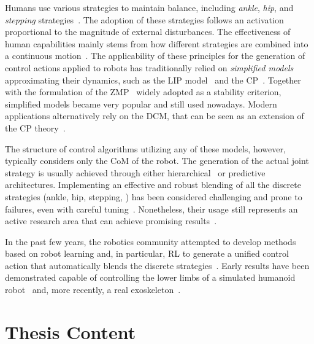 Humans use various strategies to maintain balance, including \emph{ankle}, \emph{hip}, and \emph{stepping} strategies~\parencite{nashner_organization_1985, maki_role_1997, stephens_humanoid_2007}.
The adoption of these strategies follows an activation proportional to the magnitude of external disturbances.
The effectiveness of human capabilities mainly stems from how different strategies are combined into a continuous motion~\parencite{mcgreavy_unified_2020}.
The applicability of these principles for the generation of control actions applied to robots has traditionally relied on \emph{simplified models} approximating their dynamics, such as the \ac{LIP} model~\parencite{kajita_3d_2001} and the \ac{CP}~\parencite{pratt_capture_2006}.
Together with the formulation of the \ac{ZMP}~\parencite{vukobratovic_contribution_1969, vukobratovic_zero-moment_2004} widely adopted as a stability criterion, simplified models became very popular and still used nowadays.
Modern applications alternatively rely on the \ac{DCM}, that can be seen as an extension of the \ac{CP} theory~\parencite{shafiee_online_2019}.

The structure of control algorithms utilizing any of these models, however, typically considers only the \ac{CoM} of the robot.
The generation of the actual joint strategy is usually achieved through either hierarchical~\parencite{feng_optimization_2014} or predictive~\parencite{wieber_trajectory_2006, aftab_ankle_2012} architectures.
Implementing an effective and robust blending of all the discrete strategies (ankle, hip, stepping, \etc) has been considered challenging and prone to failures, even with careful tuning~\parencite{mcgreavy_unified_2020}.
Nonetheless, their usage still represents an active research area that can achieve promising results~\parencite{jeong_robust_2019}.

In the past few years, the robotics community attempted to develop methods based on robot learning and, in particular, \ac{RL} to generate a unified control action that automatically blends the discrete strategies~\parencite{yang_learning_2018}.
Early results have been demonstrated capable of controlling the lower limbs of a simulated humanoid robot~\parencite{kim_push_2019} and, more recently, a real exoskeleton~\parencite{duburcq_reactive_2022}.

\section{Thesis Content}
\label{sec:thesis_content}

